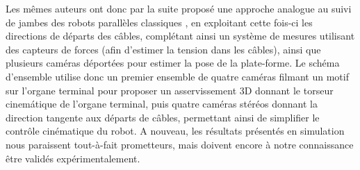 Les m\^emes auteurs ont donc par la suite propos\'e une approche analogue au
suivi de jambes des robots parall\`eles classiques \cite{dallej2012}, en
exploitant cette fois-ci les directions de d\'eparts des c\^ables, compl\'etant
ainsi un syst\`eme de mesures utilisant des capteurs de forces (afin d'estimer
la tension dans les c\^ables), ainsi que plusieurs cam\'eras d\'eport\'ees pour
estimer la pose de la plate-forme. Le sch\'ema d'ensemble utilise donc un 
premier ensemble de quatre cam\'eras filmant un motif sur l'organe terminal pour
proposer un asservissement 3D donnant le torseur cinem\'atique de l'organe
terminal, puis quatre cam\'eras st\'er\'eos donnant la direction tangente aux
d\'eparts de c\^ables, permettant ainsi de simplifier le contr\^ole
cin\'ematique du robot. A nouveau, les r\'esultats pr\'esent\'es en simulation
nous paraissent tout-\`a-fait prometteurs, mais doivent encore \`a notre
connaissance \^etre valid\'es exp\'erimentalement.


